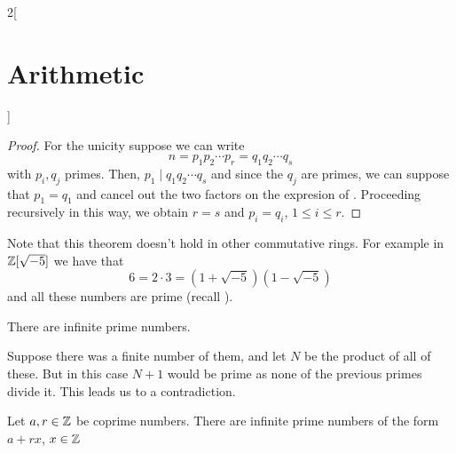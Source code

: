 \documentclass[../../../main_math.tex]{subfiles}
\begin{document}
\begin{multicols}{2}[\section{Arithmetic}]
\begin{proof}
    For the unicity suppose we can write
    \begin{equation}\label{A:fundamentalproof}
      n=p_1p_2\cdots p_r=q_1q_2\cdots q_s
    \end{equation}
    with $p_i,q_j$ primes. Then, $p_1\mid q_1q_2\cdots q_s$ and since the $q_j$ are primes, we can suppose that $p_1=q_1$ and cancel out the two factors on the expresion of . Proceeding recursively in this way, we obtain $r=s$ and $p_i=q_i$, $1\leq i\leq r$.
  \end{proof}
  \begin{remark}
    Note that this theorem doesn't hold in other commutative rings. For example in $\mathbb{Z}[\sqrt{-5}]$ we have that $$6=2\cdot 3=(1+\sqrt{-5})(1-\sqrt{-5})$$
    and all these numbers are prime (recall ).
  \end{remark}
  \begin{theorem}
    There are infinite prime numbers.
  \end{theorem}
  \begin{sproof}
    Suppose there was a finite number of them, and let $N$ be the product of all of these. But in this case $N+1$ would be prime as none of the previous primes divide it. This leads us to a contradiction.
  \end{sproof}
  \begin{theorem}
    Let $a,r\in\mathbb{Z}$ be coprime numbers. There are infinite prime numbers of the form $a+rx$, $x\in \mathbb{Z}$
  \end{theorem}

\end{multicols}
\end{document}
